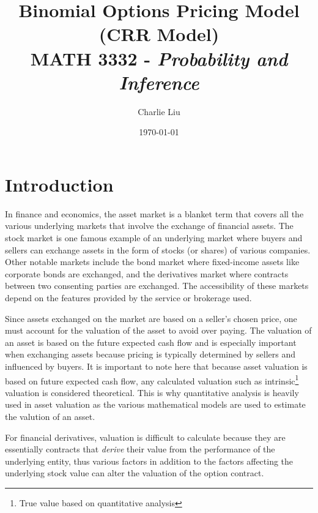 \documentclass[12pt, letterpaper]{article}\usepackage{float}
\begin{document}
\setlength\parindent{1cm}

\title{Binomial Options Pricing Model (CRR Model)\\
\large MATH 3332 - \textit{Probability and Inference}}
\author{Charlie Liu}
\date{\today}
\maketitle

\section*{Introduction}

In finance and economics, the asset market is a blanket term that covers all the various underlying markets that involve the exchange of financial assets.
The stock market is one famous example of an underlying market where buyers and sellers can exchange assets in the form of stocks (or shares) of various companies.
Other notable markets include the bond market where fixed-income assets like corporate bonds are exchanged, and the derivatives market where contracts between two consenting parties are exchanged.
The accessibility of these markets depend on the features provided by the service or brokerage used.

\medskip

Since assets exchanged on the market are based on a seller's chosen price, one must account for the valuation of the asset to avoid over paying.
The valuation of an asset is based on the future expected cash flow\cite{damodaran} and is especially important when exchanging assets because pricing is typically determined by sellers and influenced by buyers.
It is important to note here that because asset valuation is based on future expected cash flow, any calculated valuation such as intrinsic\footnote{True value based on quantitative analysis} valuation is considered theoretical.
This is why quantitative analysis is heavily used in asset valuation as the various mathematical models are used to estimate the valution of an asset.

\medskip

For financial derivatives, valuation is difficult to calculate because they are essentially contracts that \textit{derive} their value from the performance of the underlying entity\cite{derivativefinancewikipedia}, thus various factors in addition to the factors affecting the underlying stock value can alter the valuation of the option contract. 
\end{document}
